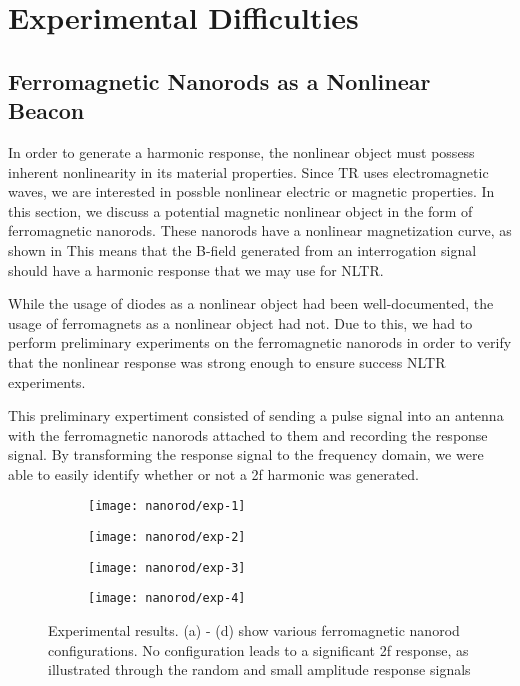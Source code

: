 \section{Experimental Difficulties}
\label{sec:nltr-expr-diff}

\subsection{Ferromagnetic Nanorods as a Nonlinear Beacon}

In order to generate a harmonic response, the nonlinear object must possess inherent nonlinearity in its material properties. Since TR uses electromagnetic waves, we are interested in possble nonlinear electric or magnetic properties. In this section, we discuss a potential magnetic nonlinear object in the form of ferromagnetic nanorods. These nanorods have a nonlinear magnetization curve, as shown in This means that the B-field generated from an interrogation signal should have a harmonic response that we may use for NLTR. 

While the usage of diodes as a nonlinear object had been well-documented, the usage of ferromagnets as a nonlinear object had not. Due to this, we had to perform preliminary experiments on the ferromagnetic nanorods in order to verify that the nonlinear response was strong enough to ensure success NLTR experiments. 

This preliminary expertiment consisted of sending a pulse signal into an antenna with the ferromagnetic nanorods attached to them and recording the response signal. By transforming the response signal to the frequency domain, we were able to easily identify whether or not a 2f harmonic was generated. 
 
 \begin{figure}[h!]
     \centering
     \begin{subfigure}{0.45\textwidth}
         \centering
         \texttt{[image: nanorod/exp-1]}
         \caption[]{}
         \label{fig:nanorod-exp-1}
     \end{subfigure}
         \begin{subfigure}{0.45\textwidth}
         \centering
         \texttt{[image: nanorod/exp-2]}
         \caption[]{}
         \label{fig:nanorod-exp-2}
     \end{subfigure}
         \begin{subfigure}{0.45\textwidth}
         \centering
         \texttt{[image: nanorod/exp-3]}
         \caption[]{}
         \label{fig:nanorod-exp-3}
     \end{subfigure}
         \begin{subfigure}{0.45\textwidth}
         \centering
         \texttt{[image: nanorod/exp-4]}
         \caption[]{}
         \label{fig:nanorod-exp-4}
     \end{subfigure}
     \caption[Ferromagnetic nanorod experimental results]{Experimental results. (a) - (d) show various ferromagnetic nanorod configurations. No configuration leads to a significant 2f response, as illustrated through the random and small amplitude response signals}
     \label{fig:nanorod-results}
 \end{figure}
 
